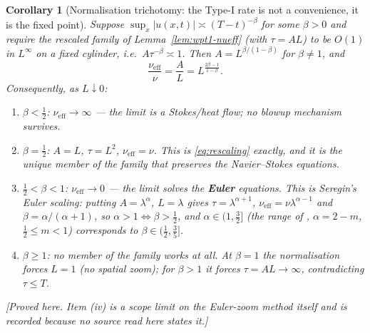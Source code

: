 \documentclass[11pt]{article}
\newtheorem{corollary}[theorem]{Corollary}
\theoremstyle{definition}
\theoremstyle{remark}
\begin{document}
\begin{corollary}[Normalisation trichotomy: the Type-I rate is not a
  convenience, it is the fixed point]\label{cor:wpt1-trichotomy}
  Suppose $\sup_x|u(x,t)|\asymp(T-t)^{-\beta}$ for some $\beta>0$ and require
  the rescaled family of Lemma~\ref{lem:wpt1-nueff} (with $\tau=AL$) to be
  $O(1)$ in $L^\infty$ on a fixed cylinder, i.e.\ $A\tau^{-\beta}\asymp1$.
  Then $A=L^{\beta/(1-\beta)}$ for $\beta\neq1$, and
  \[
    \frac{\nu_{\mathrm{eff}}}{\nu}=\frac{A}{L}=L^{\frac{2\beta-1}{1-\beta}} .
  \]
  Consequently, as $L\downarrow0$:
  \begin{enumerate}[label=\textup{(\roman*)},leftmargin=2.6em]
    \item $\beta<\tfrac12$: $\nu_{\mathrm{eff}}\to\infty$ --- the limit is a
      Stokes/heat flow; no blowup mechanism survives.
    \item $\beta=\tfrac12$: $A=L$, $\tau=L^2$, $\nu_{\mathrm{eff}}=\nu$.
      This is \eqref{eq:rescaling} exactly, and it is the \emph{unique}
      member of the family that preserves the Navier--Stokes equations.
    \item $\tfrac12<\beta<1$: $\nu_{\mathrm{eff}}\to0$ --- the limit solves
      the \textbf{Euler} equations. This is Seregin's Euler scaling: putting
      $A=\lambda^\alpha$, $L=\lambda$ gives $\tau=\lambda^{\alpha+1}$,
      $\nu_{\mathrm{eff}}=\nu\lambda^{\alpha-1}$ and
      $\beta=\alpha/(\alpha+1)$, so $\alpha>1\iff\beta>\tfrac12$, and
      $\alpha\in(1,\tfrac32]$ (the range of \cite{Seregin2026Axisym},
      $\alpha=2-m$, $\tfrac12\leq m<1$) corresponds to
      $\beta\in(\tfrac12,\tfrac35]$.
    \item $\beta\geq1$: no member of the family works at all. At $\beta=1$
      the normalisation forces $L=1$ (no spatial zoom); for $\beta>1$ it
      forces $\tau=AL\to\infty$, contradicting $\tau\leq T$.
  \end{enumerate}
  \emph{[Proved here. Item (iv) is a scope limit on the Euler-zoom method
  itself and is recorded because no source read here states it.]}
\end{corollary}
\end{document}

